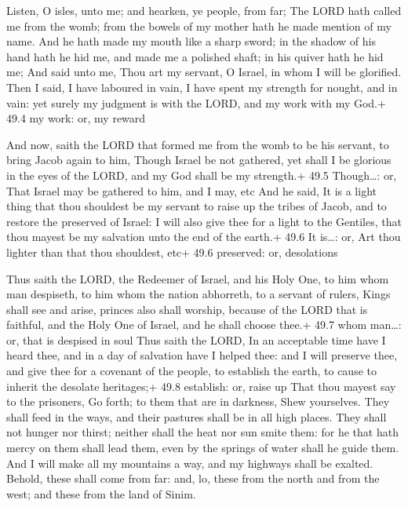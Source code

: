  Listen, O isles, unto me; and hearken, ye people, from far;
The LORD hath called me from the womb; from the bowels of my mother hath
he made mention of my name.  And he hath made my mouth like
a sharp sword; in the shadow of his hand hath he hid me, and made me a
polished shaft; in his quiver hath he hid me;  And said unto
me, Thou art my servant, O Israel, in whom I will be glorified.
 Then I said, I have laboured in vain, I have spent my
strength for nought, and in vain: yet surely my judgment is with the
LORD, and my work with my God.+ 49.4 my work: or, my reward

 And now, saith the LORD that formed me from the womb to
be his servant, to bring Jacob again to him, Though Israel be not
gathered, yet shall I be glorious in the eyes of the LORD, and my God
shall be my strength.+ 49.5 Though\ldots: or, That Israel may be
gathered to him, and I may, etc  And he said, It is a light
thing that thou shouldest be my servant to raise up the tribes of Jacob,
and to restore the preserved of Israel: I will also give thee for a
light to the Gentiles, that thou mayest be my salvation unto the end of
the earth.+ 49.6 It is\ldots: or, Art thou lighter than that thou
shouldest, etc+ 49.6 preserved: or, desolations

 Thus saith the LORD, the Redeemer of Israel, and his Holy
One, to him whom man despiseth, to him whom the nation abhorreth, to a
servant of rulers, Kings shall see and arise, princes also shall
worship, because of the LORD that is faithful, and the Holy One of
Israel, and he shall choose thee.+ 49.7 whom man\ldots: or, that is
despised in soul  Thus saith the LORD, In an acceptable time
have I heard thee, and in a day of salvation have I helped thee: and I
will preserve thee, and give thee for a covenant of the people, to
establish the earth, to cause to inherit the desolate heritages;+ 49.8
establish: or, raise up  That thou mayest say to the
prisoners, Go forth; to them that are in darkness, Shew yourselves. They
shall feed in the ways, and their pastures shall be in all high places.
 They shall not hunger nor thirst; neither shall the heat
nor sun smite them: for he that hath mercy on them shall lead them, even
by the springs of water shall he guide them.  And I will
make all my mountains a way, and my highways shall be exalted.
 Behold, these shall come from far: and, lo, these from the
north and from the west; and these from the land of Sinim.

